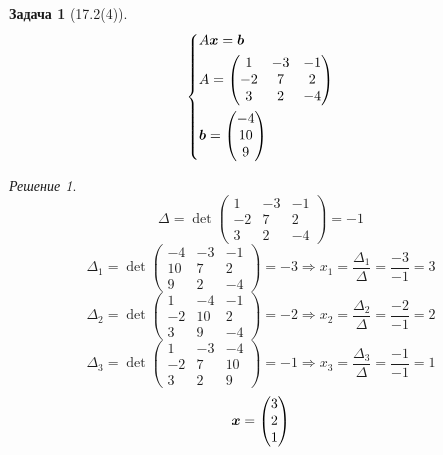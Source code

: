 \documentclass[a4paper,12pt]{article}
\newtheorem*{problem}{Задача}
\theoremstyle{definition}
\theoremstyle{remark}
\theoremstyle{remark}
\theoremstyle{remark}
\newtheorem*{solution}{Решение}
\begin{document}
  \begin{problem}[17.2(4)]
    \[
      \left\{
        \begin{aligned}
          &A \boldsymbol x = \boldsymbol b\\
          &A = \begin{pmatrix}
            1 & -3 & -1\\
            -2 & 7 & 2\\
            3 & 2 & -4
          \end{pmatrix}\\
          &\boldsymbol b = \begin{pmatrix}
            -4\\ 10\\ 9
          \end{pmatrix}
        \end{aligned}
      \right.
    \]
  \end{problem}
  
  \begin{solution}
    \[
      \Delta = \det \begin{pmatrix}
        1 & -3 & -1\\
        -2 & 7 & 2\\
        3 & 2 & -4
      \end{pmatrix} = -1
    \]
    \[
      \Delta_1 = \det \begin{pmatrix}
        -4 & -3 & -1\\
        10 & 7 & 2\\
        9 & 2 & -4
      \end{pmatrix} = -3 \Rightarrow x_1 = \frac{\Delta_1}{\Delta} = \frac{-3}{-1} = 3
    \]
    \[
      \Delta_2 = \det \begin{pmatrix}
        1 & -4 & -1\\
        -2 & 10 & 2\\
        3 & 9 & -4
      \end{pmatrix} = -2 \Rightarrow x_2 = \frac{\Delta_2}{\Delta} = \frac{-2}{-1} = 2
    \]
    \[
      \Delta_3 = \det \begin{pmatrix}
        1 & -3 & -4\\
        -2 & 7 & 10\\
        3 & 2 & 9
      \end{pmatrix} = -1 \Rightarrow x_3 = \frac{\Delta_3}{\Delta} = \frac{-1}{-1} = 1
    \]
    \[
      \boldsymbol x = \begin{pmatrix}
        3\\ 2\\ 1
      \end{pmatrix}
    \]
  \end{solution}
  
\end{document}

